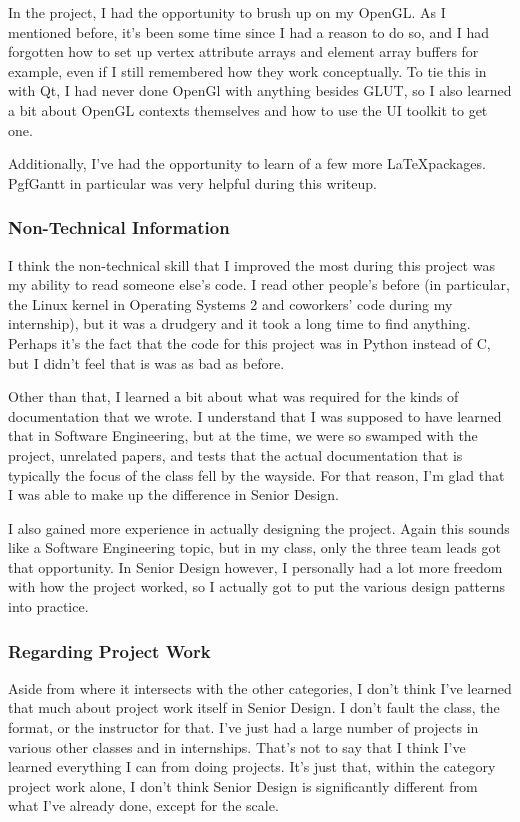 \documentclass[letterpaper,10pt, onecolumn, draftclsnofoot]{IEEEtran}
\begin{document}
In the project, I had the opportunity to brush up on my OpenGL. As I mentioned before, it's been some time since I had a reason to do so, and I had forgotten how to set up vertex attribute arrays and element array buffers for example, even if I still remembered how they work conceptually. To tie this in with Qt, I had never done OpenGl with anything besides GLUT, so I also learned a bit about OpenGL contexts themselves and how to use the UI toolkit to get one.

Additionally, I've had the opportunity to learn of a few more \LaTeX packages. PgfGantt in particular was very helpful during this writeup. 

\subsubsection{Non-Technical Information}
I think the non-technical skill that I improved the most during this project was my ability to read someone else's code. I read other people's before (in particular, the Linux kernel in Operating Systems 2 and coworkers' code during my internship), but it was a drudgery and it took a long time to find anything. Perhaps it's the fact that the code for this project was in Python instead of C, but I didn't feel that is was as bad as before.

Other than that, I learned a bit about what was required for the kinds of documentation that we wrote. I understand that I was supposed to have learned that in Software Engineering, but at the time, we were so swamped with the project, unrelated papers, and tests that the actual documentation that is typically the focus of the class fell by the wayside. For that reason, I'm glad that I was able to make up the difference in Senior Design.

I also gained more experience in actually designing the project. Again this sounds like a Software Engineering topic, but in my class, only the three team leads got that opportunity. In Senior Design however, I personally had a lot more freedom with how the project worked, so I actually got to put the various design patterns into practice.

\subsubsection{Regarding Project Work}
Aside from where it intersects with the other categories, I don't think I've learned that much about project work itself in Senior Design. I don't fault the class, the format, or the instructor for that. I've just had a large number of projects in various other classes and in internships. That's not to say that I think I've learned everything I can from doing projects. It's just that, within the category project work alone, I don't think Senior Design is significantly different from what I've already done, except for the scale.
\end{document}
